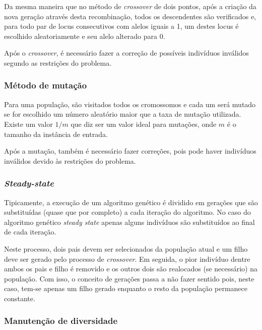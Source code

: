 \documentclass[12pt,a4paper]{article}
\begin{document}
        Da mesma maneira que no método de \textit{crossover} de dois pontos, após a criação da nova geração através desta recombinação, todos os descendentes são verificados e, para todo par de locus
        consecutivos com alelos iguais a 1, um destes locus é escolhido aleatoriamente e seu alelo alterado para 0.

        Após o \textit{crossover}, é necessário fazer a correção de possíveis indivíduos inválidos segundo as restrições do problema.

    \subsubsection{Método de mutação}

         Para uma população, são visitados todos os cromossomos e cada um será mutado se for escolhido um número aleatório maior que a taxa de mutação utilizada. Existe um valor $1/m$
         \cite{gendreau2010handbook} que diz ser um valor ideal para mutações, onde $m$ é o tamanho da instância de entrada.
         
        Após a mutação, também é necessário fazer correções, pois pode haver indivíduos inválidos devido às restrições do problema.


    \subsubsection{\emph{Steady-state}}

        Tipicamente, a execução de um algoritmo genético é dividido em gerações que são substituídas (quase que por completo) a cada iteração do algoritmo. No caso do algoritmo genético
        \emph{steady state} apenas alguns indivíduos são substituídos ao final de cada iteração.

        Neste processo, dois pais devem ser selecionados da população atual e um filho deve ser gerado pelo processo de \emph{crossover}. Em seguida, o pior indivíduo dentre ambos os pais e filho é
        removido e os outros dois são realocados (se necessário) na população. Com isso, o conceito de gerações passa a não fazer sentido pois, neste caso, tem-se apenas um filho gerado enquanto o
        resto da população permanece constante.  

    \subsubsection{Manutenção de diversidade}
\end{document}
